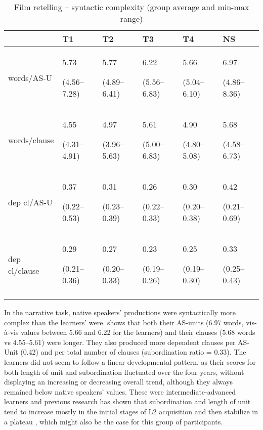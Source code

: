 \documentclass[output=paper]{langscibook}
\begin{document}
\begin{table}
\small
\begin{tabularx}{\textwidth}{lYYYYY} 
\lsptoprule
& {T1} & {T2} & {T3} & {T4} & {NS}\\
\midrule
words\slash AS-U &  5.73 

(4.56--7.28) &  5.77 

(4.89--6.41) &  6.22 

(5.56--6.83) &  5.66 

(5.04--6.10) &  6.97 

(4.86--8.36)\\
words\slash clause &  4.55 

(4.31--4.91) &  4.97 

(3.96--5.63) &  5.61 

(5.00--6.83) &  4.90 

(4.80--5.08) &  5.68 

(4.58--6.73)\\
dep cl\slash AS-U &  0.37 

(0.22--0.53) &  0.31 

(0.23--0.39) &  0.26 

(0.22--0.33) &  0.30 

(0.20--0.38) &  0.42 

(0.21--0.69)\\
dep cl\slash clause &  0.29 

(0.21--0.36) &  0.27 

(0.20--0.33) &  0.23 

(0.19--0.26) &  0.25 

(0.19--0.30) &  0.33 

(0.25--0.43)\\
\lspbottomrule
\end{tabularx}
\caption{Film retelling -- syntactic complexity (group average and min-max range)}
\label{tab:pallotti:2}
\end{table}

\begin{sloppypar}
In the narrative task, native speakers’ productions were syntactically more complex than the learners’ were.  shows that both their AS-units (6.97 words, vis-à-vis values between 5.66 and 6.22 for the learners) and their clauses (5.68 words vs 4.55--5.61) were longer. They also produced more dependent clauses per AS-Unit (0.42) and per total number of clauses (subordination ratio = 0.33). The learners did not seem to follow a linear developmental pattern, as their scores for both length of unit and subordination fluctuated over the four years, without displaying an increasing or decreasing overall trend, although they always remained below native speakers’ values. These were intermediate-advanced learners and previous research has shown that subordination and length of unit tend to increase mostly in the initial stages of L2 acquisition and then stabilize in a plateau \citep{VerspoorEtAl2012}, which might also be the case for this group of participants.
\end{sloppypar}\largerpage[2]
\end{document}
